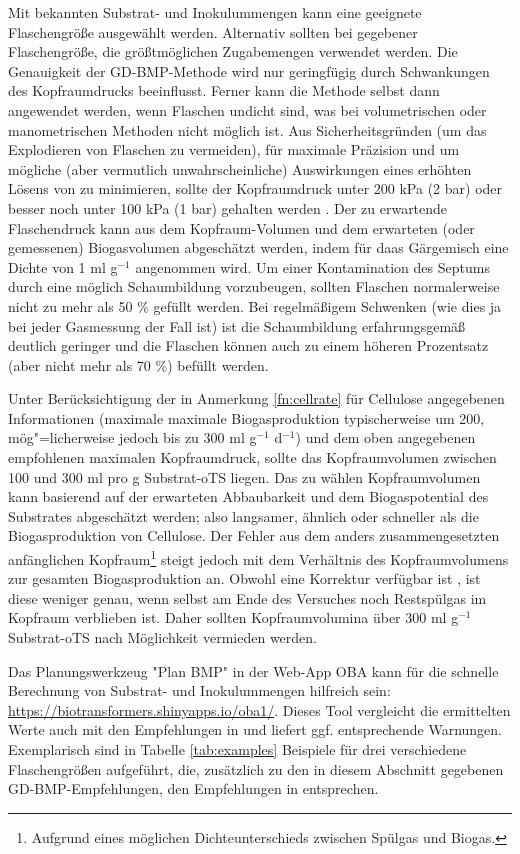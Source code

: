 \documentclass[]{article}
\begin{document}
Mit bekannten Substrat- und Inokulummengen kann eine geeignete Flaschengröße ausgewählt werden.
Alternativ sollten bei gegebener Flaschengröße, die größtmöglichen Zugabemengen verwendet werden.
Die Genauigkeit der GD-BMP-Methode wird nur geringfügig durch Schwankungen des Kopfraumdrucks beeinflusst. Ferner kann die Methode selbst dann angewendet werden, wenn Flaschen undicht sind, was bei volumetrischen oder manometrischen Methoden nicht möglich ist.
Aus Sicherheitsgründen (um das Explodieren von Flaschen zu vermeiden), für maximale Präzision und um mögliche (aber vermutlich unwahrscheinliche) Auswirkungen eines erhöhten Lösens von  zu minimieren, sollte der Kopfraumdruck unter 200 kPa (2 bar) oder besser noch unter 100 kPa (1 bar) gehalten werden \citep{hafnerSystematicErrorManometric2019}.
Der zu erwartende Flaschendruck kann aus dem Kopfraum-Volumen und dem erwarteten (oder gemessenen) Biogasvolumen abgeschätzt werden, indem für daas Gärgemisch eine Dichte von 1 ml g$^{-1}$ angenommen wird.
Um einer Kontamination des Septums durch eine möglich Schaumbildung vorzubeugen, sollten Flaschen normalerweise nicht zu mehr als 50 \% gefüllt werden. Bei regelmäßigem Schwenken (wie dies ja bei jeder Gasmessung der Fall ist) ist die Schaumbildung erfahrungsgemäß deutlich geringer und die Flaschen können auch zu einem höheren Prozentsatz (aber nicht mehr als 70 \%) befüllt werden.

Unter Berücksichtigung der in Anmerkung \ref{fn:cellrate} für Cellulose angegebenen Informationen (maximale maximale Biogasproduktion typischerweise um 200, mög"=licherweise jedoch bis zu 300 ml g$^{-1}$ d$^{-1}$) und dem oben angegebenen empfohlenen maximalen Kopfraumdruck, sollte das Kopfraumvolumen zwischen 100 und 300 ml pro g Substrat-oTS liegen.
Das zu wählen Kopfraumvolumen kann basierend auf der erwarteten Abbaubarkeit und dem Biogaspotential des Substrates abgeschätzt werden; also langsamer, ähnlich oder schneller als die Biogasproduktion von Cellulose.
Der Fehler aus dem anders zusammengesetzten anfänglichen Kopfraum\footnote{Aufgrund eines möglichen Dichteunterschieds zwischen Spülgas und Biogas.} steigt jedoch mit dem Verhältnis des Kopfraumvolumens zur gesamten Biogasproduktion an. Obwohl eine Korrektur verfügbar ist \citep{justesenDevelopmentValidationLowcost2019}, ist diese weniger genau, wenn selbst am Ende des Versuches noch Restspülgas im Kopfraum verblieben ist.
Daher sollten Kopfraumvolumina über 300 ml g$^{-1}$ Substrat-oTS nach Möglichkeit vermieden werden.

Das Planungswerkzeug "Plan BMP" in der Web-App OBA kann für die schnelle Berechnung von Substrat- und Inokulummengen hilfreich sein: \url{https://biotransformers.shinyapps.io/oba1/}.
Dieses Tool vergleicht die ermittelten Werte auch mit den Empfehlungen in \citet{holligerStandardizationBiomethanePotential2016} und liefert ggf. entsprechende Warnungen.
Exemplarisch sind in Tabelle \ref{tab:examples} Beispiele für drei verschiedene Flaschengrößen aufgeführt, die, zusätzlich zu den in diesem Abschnitt gegebenen GD-BMP-Empfehlungen, den Empfehlungen in \citet{holligerStandardizationBiomethanePotential2016} entsprechen.
\end{document}
